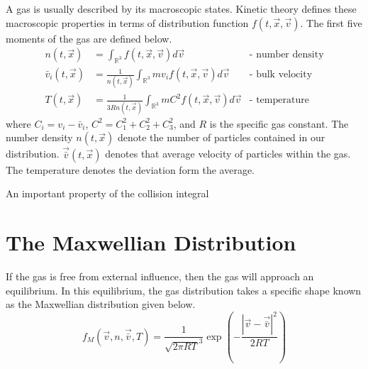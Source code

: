 \documentclass[12pt]{CSUNthesis}
\newcommand{\vecx}{\vec{x}}
\newcommand{\vecv}{\vec{v}}
\newcommand{\bulkv}{\vec{\bar{v}}} %
\begin{document}
A gas is usually described by its macroscopic states. Kinetic theory defines these macroscopic properties in terms of distribution function $f(t,\vecx, \vecv)$. The first five moments of the gas are defined below.
\begin{align}
	n(t,\vec{x})&=\int_{\mathbb{R}^3}  f(t,\vec{x},\vec{v}) d\vec{v} &\text{- number density}  \label{eq:dens} \\
	\bar{v}_i(t,\vec{x})&=\frac{1}{n(t,\vec{x})} \int_{\mathbb{R}^3} m v_i f(t,\vec{x},\vec{v}) d\vec{v} &\text{- bulk velocity} \label{eq:bulk} \\
	T(t,\vec{x}) &= \frac{1}{3Rn(t,\vecx)}\int_{\mathbb{R}^3} m C^2 f(t,\vec{x},\vec{v}) d\vec{v} &\text{- temperature} \label{eq:temperature}
\end{align}
where $C_i=v_i-\bar{v}_i$, $C^2=C_1^2 + C_2^2 + C_3^2$, and $R$ is the specific gas constant. The number density $n(t, \vecx)$ denote the number of particles contained in our distribution. $\bulkv (t,\vecx)$ denotes that average velocity of particles within the gas. The temperature denotes the deviation form the average. 

An important property of the collision integral 

\section{The Maxwellian Distribution}

If the gas is free from external influence, then the gas will approach an equilibrium. In this equilibrium, the gas distribution takes a specific shape known as the Maxwellian distribution given below.
\begin{equation}
f_M(\vec{v},n,\vec{\bar{v}},T) = \frac{1}{\sqrt{2 \pi R T}^3} \exp\left( -\frac{ |\vec{v} - \vec{\bar{v}}|^2}{2RT} \right)
\end{equation} 
	
\end{document}
